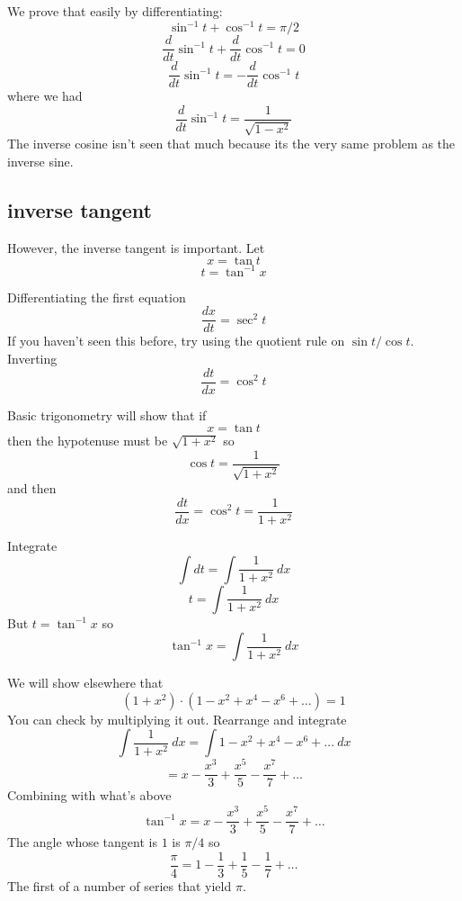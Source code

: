 \documentclass[11pt, oneside]{article}
\begin{document}
We prove that easily by differentiating:
\[ \sin^{-1} t + \cos^{-1} t = \pi/2 \]
\[ \frac{d}{dt} \sin^{-1} t + \frac{d}{dt}  \cos^{-1} t = 0 \]
\[ \frac{d}{dt} \sin^{-1} t = - \frac{d}{dt}  \cos^{-1} t \]
where we had
\[ \frac{d}{dt} \sin^{-1} t = \frac{1}{\sqrt{1 - x^2}} \]
The inverse cosine isn't seen that much because its the very same problem as the inverse sine.  

\subsection*{inverse tangent}
However, the inverse tangent is important.  Let
\[ x = \tan t \]
\[ t = \tan^{-1} x \]

Differentiating the first equation
\[ \frac{dx}{dt} = \sec^2 t \]
If you haven't seen this before, try using the quotient rule on $\sin t / \cos t$.
Inverting
\[ \frac{dt}{dx} = \cos^2 t \]

Basic trigonometry will show that if
\[ x = \tan t \]
then the hypotenuse must be $\sqrt{1 + x^2}$ so
\[ \cos t = \frac{1}{\sqrt{1 + x^2}} \]
and then
\[ \frac{dt}{dx} = \cos^2 t = \frac{1}{1 + x^2} \]

Integrate
\[ \int dt = \int \frac{1}{1 + x^2} \ dx  \]
\[ t = \int \frac{1}{1 + x^2} \ dx  \]
But $t = \tan^{-1} x$ so
\[ \tan^{-1} x = \int \frac{1}{1 + x^2} \ dx  \]

We will show elsewhere that
\[ (1 + x^2) \cdot (1 - x^2 + x^4 - x^6 + \dots) = 1 \]
You can check by multiplying it out.  Rearrange and integrate
\[    \int \frac{1}{1+x^2} \ dx =  \int 1 - x^2 + x^4 - x^6 + \dots \ dx \]
\[ = x - \frac{x^3}{3} + \frac{x^5}{5} - \frac{x^7}{7} + \dots \]
Combining with what's above
\[ \tan^{-1} x = x - \frac{x^3}{3} + \frac{x^5}{5} - \frac{x^7}{7} + \dots \]
The angle whose tangent is $1$ is $\pi/4$ so
\[ \frac{\pi}{4} = 1 - \frac{1}{3} + \frac{1}{5} - \frac{1}{7} + \dots \]
The first of a number of series that yield $\pi$.
\end{document}
